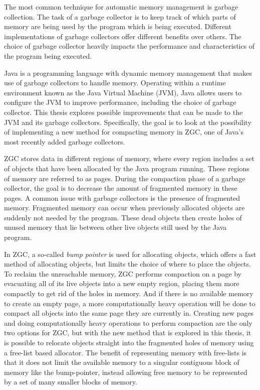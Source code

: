

The most common technique for automatic memory management is garbage collection. The task of a garbage collector is to keep track of which parts of memory are being used by the program which is being executed. Different implementations of garbage collectors offer different benefits over others. The choice of garbage collector heavily impacts the performance and characteristics of the program being executed.

Java is a programming language with dynamic memory management that makes use of garbage collectors to handle memory. Operating within a runtime environment known as the Java Virtual Machine (JVM), Java allows users to configure the JVM to improve performance, including the choice of garbage collector. This thesis explores possible improvements that can be made to the JVM and its garbage collectors. Specifically, the goal is to look at the possibility of implementing a new method for compacting memory in ZGC, one of Java's most recently added garbage collectors.

ZGC stores data in different regions of memory, where every region includes a set of objects that have been allocated by the Java program running. These regions of memory are referred to as pages. During the compaction phase of a garbage collector, the goal is to decrease the amount of fragmented memory in these pages. A common issue with garbage collectors is the presence of fragmented memory. Fragmented memory can occur when previously allocated objects are suddenly not needed by the program. These dead objects then create holes of unused memory that lie between other live objects still used by the Java program. 

In ZGC, a so-called \textit{bump pointer} is used for allocating objects, which offers a fast method of allocating objects, but limits the choice of where to place the objects. To reclaim the unreachable memory, ZGC performs compaction on a page by evacuating all of its live objects into a new empty region, placing them more compactly to get rid of the holes in memory. And if there is no available memory to create an empty page, a more computationally heavy operation will be done to compact all objects into the same page they are currently in. Creating new pages and doing computationally heavy operations to perform compaction are the only two options for ZGC, but with the new method that is explored in this thesis, it is possible to relocate objects straight into the fragmented holes of memory using a free-list based allocator. The benefit of representing memory with free-lists is that it does not limit the available memory to a singular contiguous block of memory like the bump-pointer, instead allowing free memory to be represented by a set of many smaller blocks of memory.


